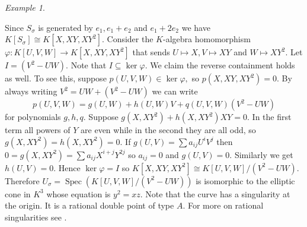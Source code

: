 \documentclass[BSc]{usydthesis}
\numberwithin{equation}{chapter}
\theoremstyle{remark}
\newtheorem{Example}[equation]{Example}
\newcommand{\V}{\vee}
\DeclareMathOperator{\Spec}{Spec}
\begin{document}
\begin{Example}
\begin{figure}[ht]
  \centering
  \label{figure:lattice3}
\end{figure}

Since $S_{\sigma}$ is generated by $e_1, e_1+e_2$ and $e_1+2e_2$ we have $K[S_{\sigma}] \cong K[X,XY,XY^2].$ Consider the $K$-algebra homomorphism $\varphi: K[U,V,W]\to K[X,XY,XY^2]$ that sends $U \mapsto X, V \mapsto XY$ and $W \mapsto XY^2.$ Let $I= (V^2-UW).$ Note that $I\subseteq \ker \varphi.$ We claim the reverse containment holds as well. To see this, suppose $p(U,V,W)\in \ker \varphi,$ so $p(X,XY, XY^2)=0.$ By always writing $V^2 = UW + (V^2-UW)$ we can write $$p(U,V,W) = g(U,W) + h(U,W)V + q(U,V,W)(V^2-UW)$$ for polynomials $g,h,q.$ Suppose $g(X,XY^2)+h(X,XY^2)XY=0.$ In the first term all powers of $Y$ are even while in the second they are all odd, so $g(X,XY^2) = h(X,XY^2)=0.$ If $g(U,V) = \sum a_{ij} U^i V^j$ then $0=g(X,XY^2) = \sum a_{ij} X^{i+j} Y^{2j}$ so $a_{ij}=0$ and $g(U,V)=0.$ Similarly we get $h(U,V)=0.$ Hence $\ker \varphi = I$ so $K[X,XY,XY^2] \cong K[U,V,W]/(V^2-UW).$ Therefore $U_{\sigma} = \Spec (K[U,V,W]/(V^2-UW))$ is isomorphic to the elliptic cone in $K^3$ whose equation is $y^2=xz.$ Note that the curve has a singularity at the origin. It is a rational double point of type $A.$ For more on rational singularities see \cite{Reid:DuVal, Slodowy, Steinberg-Conjugacy}.


\end{Example}
\end{document}
